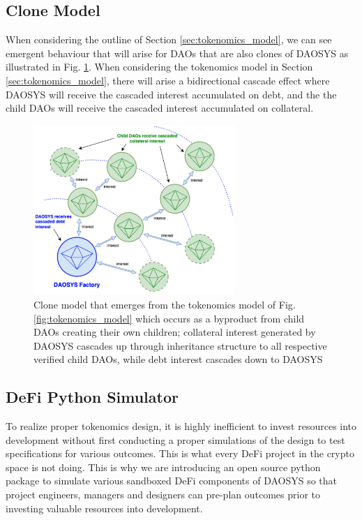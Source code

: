 \documentclass[journal,twocolumn,12pt]{ieeesyscoin}
\begin{document}
\subsection{Clone Model}
\label{sec:clone_model}

When considering the outline of Section \ref{sec:tokenomics_model}, we can see emergent behaviour that will arise for DAOs that are also clones of DAOSYS as illustrated in Fig. \ref{fig:clone_model}. When considering the tokenomics model in Section 
\ref{sec:tokenomics_model}, there will arise a bidirectional cascade effect where DAOSYS will receive the cascaded interest accumulated on debt, and the the child DAOs will receive the cascaded interest accumulated on collateral.

\begin{figure}[h!]
\includegraphics[width=3in]{img/clone_model.png}
\caption{Clone model that emerges from the tokenomics model of Fig. \ref{fig:tokenomics_model} which occurs as a byproduct from child DAOs creating their own children; collateral interest generated by DAOSYS cascades up through inheritance structure to all respective verified child DAOs, while debt interest cascades down to DAOSYS} 
\label{fig:clone_model}
\end{figure} 

\subsection{DeFi Python Simulator}
\label{sec:python_simulator}

To realize proper tokenomics design, it is highly inefficient to invest resources into development without first conducting a proper simulations of the design to test specifications for various outcomes. This is what every DeFi project in the crypto space is not doing. This is why we are introducing an open source python package to simulate various sandboxed DeFi components of DAOSYS so that project engineers, managers and designers can pre-plan outcomes prior to investing valuable resources into development.
\end{document}
